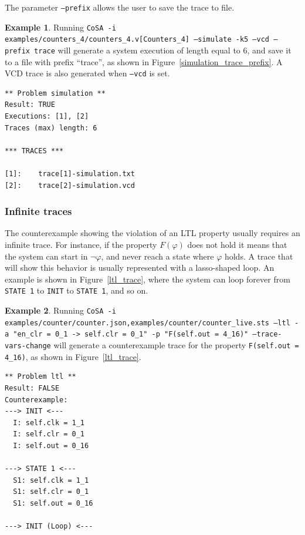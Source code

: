\documentclass{article}
\theoremstyle{definition}
\newtheorem{example}{Example}[section]
\begin{document}
The parameter \texttt{--prefix} allows the user to save the trace to
file.

\begin{example}
  Running \texttt{CoSA -i
    examples/counters\_4/counters\_4.v[Counters\_4] --simulate -k5
    --vcd --prefix trace} will generate a system execution of length
  equal to 6, and save it to a file with prefix ``trace'', as shown in
  Figure~\ref{simulation_trace_prefix}. A VCD trace is also generated
  when \texttt{--vcd} is set.

\begin{lstlisting}[frame=single,language=ets,caption=Simulation Counter\_4 (with prefix),label=simulation_trace_prefix]
** Problem simulation **
Result: TRUE
Executions: [1], [2]
Traces (max) length: 6

*** TRACES ***

[1]:	trace[1]-simulation.txt
[2]:	trace[2]-simulation.vcd
\end{lstlisting}

\end{example}



\subsubsection{Infinite traces}

The counterexample showing the violation of an LTL property usually
requires an infinite trace. For instance, if the property $F(\varphi)$
does not hold it means that the system can start in $\neg \varphi$,
and never reach a state where $\varphi$ holds. A trace that will show
this behavior is usually represented with a lasso-shaped loop. An
example is shown in Figure~\ref{ltl_trace}, where the system can loop
forever from \texttt{STATE 1} to \texttt{INIT} to \texttt{STATE 1},
and so on.

\begin{example}
  Running \texttt{CoSA -i
    examples/counter/counter.json,examples/counter/counter\_live.sts
    --ltl -a "en\_clr = 0\_1 -> self.clr = 0\_1" -p "F(self.out =
    4\_16)" --trace-vars-change} will generate a counterexample trace
  for the property \texttt{F(self.out = 4\_16)}, as shown in
  Figure~\ref{ltl_trace}.

\begin{lstlisting}[frame=single,language=ets,caption=Simulation Counter\_4 (with changing values),label=ltl_trace]
** Problem ltl **
Result: FALSE
Counterexample:
---> INIT <---
  I: self.clk = 1_1
  I: self.clr = 0_1
  I: self.out = 0_16

---> STATE 1 <---
  S1: self.clk = 1_1
  S1: self.clr = 0_1
  S1: self.out = 0_16

---> INIT (Loop) <---
\end{lstlisting}

\end{example}
\end{document}
